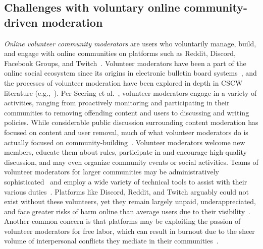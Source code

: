 \subsection{Challenges with voluntary online community-driven moderation}
\textit{Online volunteer community moderators} are users who voluntarily manage, build, and engage with online communities on platforms such as Reddit, Discord, Facebook Groups, and Twitch~\cite{seering2019moderator}. Volunteer moderators have been a part of the online social ecosystem since its origins in electronic bulletin board systems~\cite{stone1993vampires}, and the processes of volunteer moderation have been explored in depth in CSCW literature (e.g.,~\cite{seering2020reconsidering, gilbert2020cesspool, srinivasan2019removal, geiger2010work, seering2017shaping, chandrasekharan2018internet, jiang2019voice, kiene2019frames, jhaver2019explanations, chandrasekharan2019crossmod, cullen2022practicing, cai2021profiling, schluger2022proactive}). Per Seering et al.~\cite{seering2019moderator}, volunteer moderators engage in a variety of activities, ranging from proactively monitoring and participating in their communities to removing offending content and users to discussing and writing policies. While considerable public discussion surrounding content moderation has focused on content and user removal, much of what volunteer moderators do is actually focused on community-building~\cite{seering2022whomoderates, seering2022metaphors, gibson2023teams}. Volunteer moderators welcome new members, educate them about rules, participate in and encourage high-quality discussion, and may even organize community events or social activities. Teams of volunteer moderators for larger communities may be administratively sophisticated~\cite{gilbert2020cesspool} and employ a wide variety of technical tools to assist with their various duties~\cite{kiene2019frames}. Platforms like Discord, Reddit, and Twitch arguably could not exist without these volunteers, yet they remain largely unpaid, underappreciated, and face greater risks of harm online than average users due to their visibility~\cite{seering2022pride,gilbert2023towards}. Another common concern is that platforms may be exploiting the passion of volunteer moderators for free labor, which can result in burnout due to the sheer volume of interpersonal conflicts they mediate in their communities~\cite{seering2019beyond,yu2020fruit,schopkegonzalez2022burnout}. 

